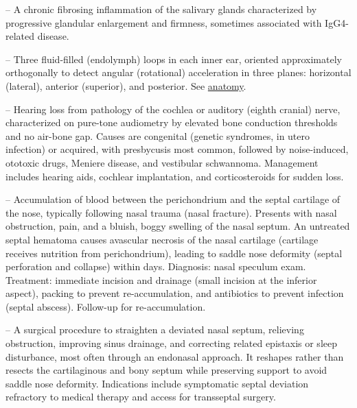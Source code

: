 -- A chronic fibrosing inflammation of the salivary glands characterized by progressive glandular enlargement and firmness, sometimes associated with IgG4-related disease.

-- Three fluid-filled (endolymph) loops in each inner ear, oriented approximately orthogonally to detect angular (rotational) acceleration in three planes: horizontal (lateral), anterior (superior), and posterior. See \hyperlink{Anatomy}{anatomy}.

-- Hearing loss from pathology of the cochlea or auditory (eighth cranial) nerve, characterized on pure-tone audiometry by elevated bone conduction thresholds and no air-bone gap. Causes are congenital (genetic syndromes, in utero infection) or acquired, with presbycusis most common, followed by noise-induced, ototoxic drugs, Meniere disease, and vestibular schwannoma. Management includes hearing aids, cochlear implantation, and corticosteroids for sudden loss.

-- Accumulation of blood between the perichondrium and the septal cartilage of the nose, typically following nasal trauma (nasal fracture). Presents with nasal obstruction, pain, and a bluish, boggy swelling of the nasal septum. An untreated septal hematoma causes avascular necrosis of the nasal cartilage (cartilage receives nutrition from perichondrium), leading to saddle nose deformity (septal perforation and collapse) within days. Diagnosis: nasal speculum exam. Treatment: immediate incision and drainage (small incision at the inferior aspect), packing to prevent re-accumulation, and antibiotics to prevent infection (septal abscess). Follow-up for re-accumulation.

-- A surgical procedure to straighten a deviated nasal septum, relieving obstruction, improving sinus drainage, and correcting related epistaxis or sleep disturbance, most often through an endonasal approach. It reshapes rather than resects the cartilaginous and bony septum while preserving support to avoid saddle nose deformity. Indications include symptomatic septal deviation refractory to medical therapy and access for transseptal surgery.

